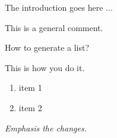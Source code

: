 \reviewer

The introduction goes here ...

\begin{generalcomment}
	This is a general comment.
\end{generalcomment}

\begin{revcomment}
	How to generate a list?
\end{revcomment}

\begin{revresponse}
	This is how you do it.
	\begin{enumerate}
		\item item 1
		\item item 2
	\end{enumerate}

\end{revresponse}

\begin{revcomment}
	\emph{Emphasis the changes.}
\end{revcomment}

